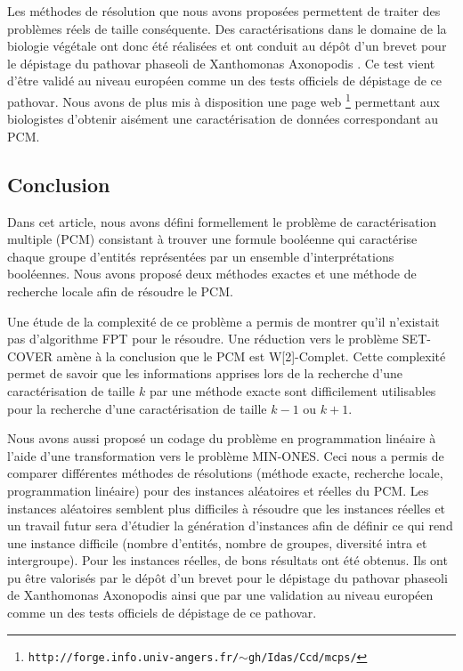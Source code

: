 \documentclass[a4paper,10pt]{article}
\begin{document}
Les méthodes de résolution que nous avons proposées permettent de traiter des problèmes réels de taille conséquente. Des caractérisations dans le domaine de la biologie végétale ont donc été réalisées et ont conduit au dépôt d'un brevet pour le dépistage du pathovar phaseoli de Xanthomonas Axonopodis \cite{Boureau2012}. Ce test vient d'être validé au niveau européen comme un des tests officiels de dépistage de ce pathovar. Nous avons de plus mis à disposition une page web \footnote{\texttt{http://forge.info.univ-angers.fr/$\sim$gh/Idas/Ccd/mcps/}} permettant aux biologistes d'obtenir aisément une caractérisation de données correspondant au PCM.


\subsection{Conclusion}

Dans cet article, nous avons défini formellement le problème de caractérisation multiple (PCM) consistant à trouver une formule booléenne qui caractérise chaque groupe d'entités représentées par un ensemble d'interprétations booléennes. Nous avons proposé deux méthodes exactes et une méthode de recherche locale afin de résoudre le PCM.

Une étude de la complexité de ce problème a permis de montrer qu'il n'existait pas d'algorithme FPT pour le résoudre. Une réduction vers le problème SET-COVER amène à la conclusion que le PCM est W[2]-Complet. Cette complexité permet de savoir que les informations apprises lors de la recherche d'une caractérisation de taille $k$ par une méthode exacte sont difficilement utilisables pour la recherche d'une caractérisation de taille $k-1$ ou $k+1$.

Nous avons aussi proposé un codage du problème en programmation linéaire à l'aide d'une transformation vers le problème MIN-ONES. Ceci nous a permis de comparer différentes méthodes de résolutions (méthode exacte, recherche locale, programmation linéaire) pour des instances aléatoires et réelles du PCM. Les instances aléatoires semblent plus difficiles à résoudre que les instances réelles et un travail futur sera d'étudier la génération d'instances afin de définir ce qui rend une instance difficile (nombre d'entités, nombre de groupes, diversité intra et intergroupe). Pour les instances réelles, de bons résultats ont été obtenus. Ils ont pu être valorisés par le dépôt d'un brevet pour le dépistage du pathovar phaseoli de Xanthomonas Axonopodis ainsi que par une validation au niveau européen comme un des tests officiels de dépistage de ce pathovar.
\end{document}
